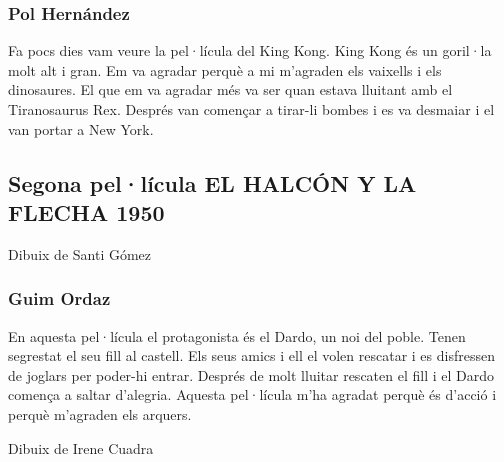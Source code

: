 \begin{news}
\subsubsection*{Pol Hernández}
Fa pocs dies vam veure la pel·lícula del King Kong. 
King Kong és un goril·la molt alt i gran.
Em va agradar perquè a mi m’agraden els vaixells i els dinosaures. El que em va agradar més va ser quan estava lluitant amb el Tiranosaurus  Rex.
Després van començar a tirar-li bombes i es va desmaiar i el van portar a New York.



\subsection*{Segona pel·lícula EL HALCÓN Y LA FLECHA 1950}
\noindent{}
Dibuix de Santi Gómez

\subsubsection*{
Guim Ordaz
}

En aquesta pel·lícula el protagonista és el Dardo, un noi del poble. Tenen segrestat el seu fill al castell. Els seus amics i ell el volen rescatar i es disfressen de joglars per poder-hi entrar. Després de molt lluitar rescaten el fill i el Dardo comença a saltar d’alegria.
Aquesta pel·lícula m’ha agradat perquè és d’acció i perquè m’agraden els arquers.


\noindent{}
Dibuix de Irene Cuadra


\end{news}

